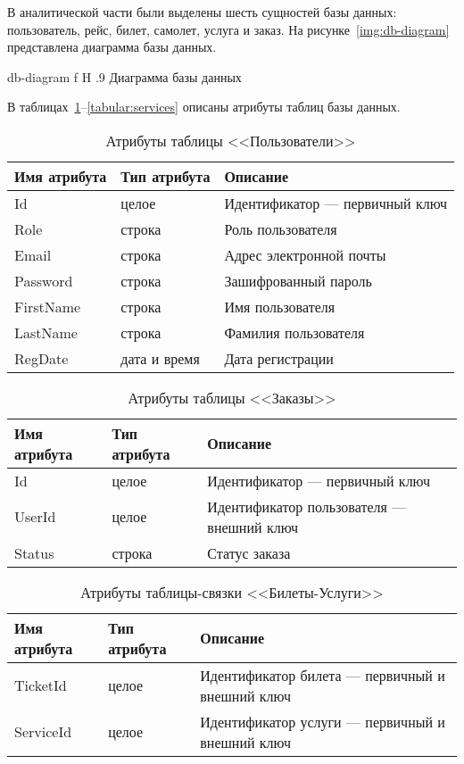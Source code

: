 \documentclass{bmstu}
\begin{document}
В аналитической части были выделены шесть сущностей базы данных: пользователь, рейс, билет, самолет, услуга и заказ. 
На рисунке~\ref{img:db-diagram} представлена диаграмма базы данных.

    {db-diagram}
    {f}
    {H}
    {.9\textwidth}
    {Диаграмма базы данных}

В таблицах~\ref{tabular:users}--\ref{tabular:services} описаны атрибуты таблиц базы данных.

\begin{table}[H]
\caption{Атрибуты таблицы <<Пользователи>>}
\label{tabular:users}
\begin{tabular}{|>{\raggedleft}p{4cm}|>{\raggedleft}p{3cm}|>{\raggedleft}p{8cm}|}
\hline
\textbf{Имя атрибута} & \textbf{Тип атрибута} & \textbf{Описание}
\tabularnewline
\hline
Id & целое & Идентификатор --- первичный ключ
\tabularnewline
\hline
Role & строка & Роль пользователя
\tabularnewline
\hline
Email & строка & Адрес электронной почты
\tabularnewline
\hline
Password & строка & Зашифрованный пароль
\tabularnewline
\hline
FirstName & строка & Имя пользователя
\tabularnewline
\hline
LastName & строка & Фамилия пользователя
\tabularnewline
\hline
RegDate & дата и время & Дата регистрации
\tabularnewline
\hline
\end{tabular}
\end{table}

\begin{table}[H]
\caption{Атрибуты таблицы <<Заказы>>}
\label{tabular:orders}
\begin{tabular}{|>{\raggedleft}p{4cm}|>{\raggedleft}p{3cm}|>{\raggedleft}p{8cm}|}
\hline
\textbf{Имя атрибута} & \textbf{Тип атрибута} & \textbf{Описание}
\tabularnewline
\hline
Id & целое & Идентификатор --- первичный ключ
\tabularnewline
\hline
UserId & целое & Идентификатор пользователя --- внешний ключ
\tabularnewline
\hline
Status & строка & Статус заказа
\tabularnewline
\hline
\end{tabular}
\end{table}

\begin{table}[H]
\caption{Атрибуты таблицы-связки <<Билеты-Услуги>>}
\label{tabular:tickets_services}
\begin{tabular}{|>{\raggedleft}p{4cm}|>{\raggedleft}p{3cm}|>{\raggedleft}p{8cm}|}
\hline
\textbf{Имя атрибута} & \textbf{Тип атрибута} & \textbf{Описание}
\tabularnewline
\hline
TicketId & целое & Идентификатор билета --- первичный и внешний ключ
\tabularnewline
\hline
ServiceId & целое & Идентификатор услуги --- первичный и внешний ключ
\tabularnewline
\hline
\end{tabular}
\end{table}
\end{document}
